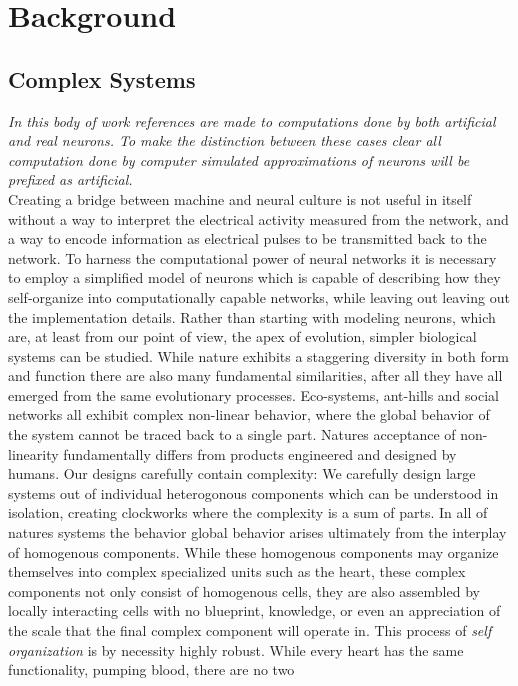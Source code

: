 \chapter{Background}
\section{Complex Systems}
\emph{
  In this body of work references are made to computations done
  by both artificial and real neurons. To make the distinction
  between these cases clear all computation done by computer
  simulated approximations of neurons will be prefixed as
  artificial.
}\\
Creating a bridge between machine and neural culture is not
useful in itself without a way to interpret the electrical activity measured
from the network, and a way to encode information as electrical pulses to be
transmitted back to the network. To harness the computational power of neural
networks it is necessary to employ a simplified model of neurons which is capable of
describing how they self-organize into computationally capable networks, while leaving out
leaving out the implementation details.
Rather than starting with modeling neurons, which are, at least from our point of view, the
apex of evolution, simpler biological systems can be studied.
While nature exhibits a staggering diversity in both form and function there are
also many fundamental similarities, after all they have all emerged from
the same evolutionary processes.
Eco-systems, ant-hills and social networks all exhibit
complex non-linear behavior, where the global behavior of the system cannot be
traced back to a single part.
Natures acceptance of non-linearity fundamentally differs from products
engineered and designed by humans.
Our designs carefully contain complexity: We carefully design large systems out of
individual heterogonous components which can be understood in isolation,
creating clockworks where the complexity is a sum of parts.
In all of natures systems the behavior global behavior arises ultimately from
the interplay of homogenous components.
While these homogenous components may organize themselves into complex
specialized units such as the heart, these complex components not only consist
of homogenous cells, they are also assembled by locally interacting cells with
no blueprint, knowledge, or even an appreciation of the scale that the final
complex component will operate in.
This process of \emph{self organization} is by necessity highly robust. While
every heart has the same functionality, pumping blood, there are no two

